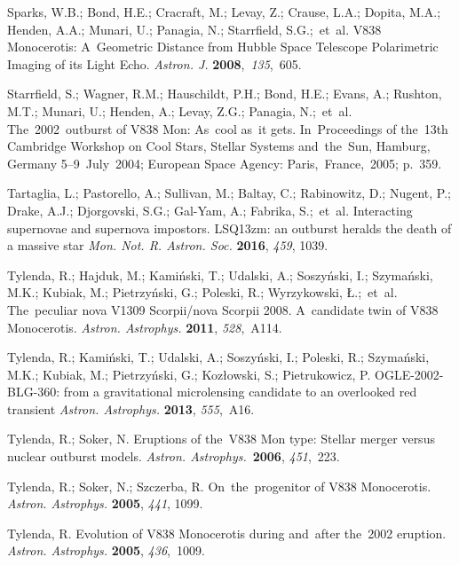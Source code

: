 \documentclass[galaxies,article,accept,moreauthors,pdftex]{mdpi}
\makeatletter
\let\jnl@style=\rmfamily
\def\ref@jnl#1{{\jnl@style#1}}%
\newcommand\aj{\ref@jnl{Astron. J.}}%
\newcommand\aap{\ref@jnl{Astron. Astrophys.}}%
\newcommand\mnras{\ref@jnl{Mon. Not. R. Astron. Soc.}}%
\makeatother
\begin{document}
\begin{thebibliography}{999}
 Sparks, W.B.; Bond, H.E.; Cracraft, M.; Levay, Z.; Crause, L.A.; Dopita, M.A.; Henden, A.A.; Munari, U.; Panagia, N.; Starrfield, S.G.;~et~al. V838 Monocerotis: A~Geometric Distance from Hubble Space Telescope Polarimetric Imaging of its Light Echo. {\em \aj} {\textbf{2008}},~\emph{135},~605.


 Starrfield, S.; Wagner, R.M.; Hauschildt, P.H.; Bond, H.E.; Evans, A.; Rushton, M.T.; Munari, U.; Henden, A.; Levay, Z.G.; Panagia, N.;~et~al. The~2002~outburst of V838 Mon: As~cool as~it gets. In~Proceedings of the~13th Cambridge Workshop on Cool Stars, Stellar Systems and~the~Sun, Hamburg, Germany 5--9~July~2004; European Space Agency: Paris,~France,~2005; p.~359.


 Tartaglia, L.; Pastorello, A.; Sullivan, M.; Baltay, C.; Rabinowitz, D.; Nugent, P.; Drake, A.J.; Djorgovski, S.G.; Gal-Yam, A.; Fabrika, S.;~et~al. Interacting supernovae and supernova impostors. LSQ13zm: an outburst heralds the death of a massive star  {\em \mnras} \textbf{2016}, \emph{459}, 1039.


 Tylenda, R.; Hajduk, M.; Kamiński, T.; Udalski, A.; Soszyński, I.; Szymański, M.K.; Kubiak, M.; Pietrzyński, G.; Poleski, R.; Wyrzykowski, Ł.;~et~al. The~peculiar nova V1309 Scorpii/nova Scorpii 2008. A~candidate twin of V838 Monocerotis. {\em \aap} \textbf{2011}, \emph{528},~A114.


 Tylenda, R.; Kamiński, T.; Udalski, A.; Soszyński, I.; Poleski, R.; Szymański, M.K.; Kubiak, M.; Pietrzyński, G.; Kozłowski, S.; Pietrukowicz, P. OGLE-2002-BLG-360: from a gravitational microlensing candidate to an overlooked red transient {\em \aap} \textbf{2013}, \emph{555},~A16.


 Tylenda, R.; Soker, N. Eruptions of the~V838 Mon type: Stellar merger versus nuclear outburst models. {\em \aap}~\textbf{2006}, \emph{451},~223.


 Tylenda, R.; Soker, N.; Szczerba, R. On~the~progenitor of V838 Monocerotis. {\em \aap} \textbf{2005}, \emph{441}, 1099.



 Tylenda, R. Evolution of V838 Monocerotis during and~after the~2002 eruption. {\em \aap} \textbf{2005}, \emph{436},~1009.




\end{thebibliography}
\end{document}
